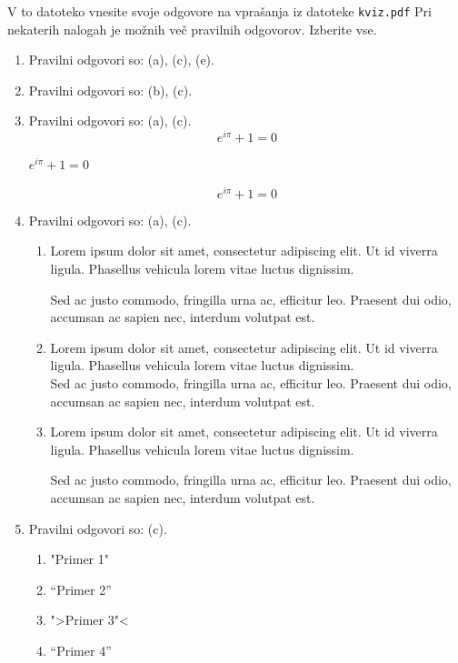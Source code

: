 \documentclass[11pt]{article}
\begin{document}
V to datoteko vnesite svoje odgovore na vprašanja iz datoteke \texttt{kviz.pdf}
Pri nekaterih nalogah je možnih več pravilnih odgovorov. Izberite vse.

\begin{enumerate}
    \item Pravilni odgovori so: (a), (c), (e).
    
    \item Pravilni odgovori so: (b), (c).
    
    \item Pravilni odgovori so: (a), (c).
      \[ e^{i \pi} + 1 = 0 \]
      \begin{center}
          \( e^{i \pi} + 1 = 0 \)
      \end{center}
      \begin{equation*}
          e^{i \pi} + 1 = 0
      \end{equation*}

    \item Pravilni odgovori so: (a), (c).
        \begin{enumerate}
            \item {
Lorem ipsum dolor sit amet, consectetur adipiscing 
elit. Ut id viverra ligula. Phasellus vehicula lorem 
vitae luctus dignissim. 
                
Sed ac justo commodo, fringilla urna ac, efficitur 
leo. Praesent dui odio, accumsan ac sapien nec, 
interdum volutpat est. 
            }
            \item {
Lorem ipsum dolor sit amet, consectetur adipiscing 
elit. Ut id viverra ligula. Phasellus vehicula lorem 
vitae luctus dignissim. \\
Sed ac justo commodo, fringilla urna ac, efficitur 
leo. Praesent dui odio, accumsan ac sapien nec, 
interdum volutpat est.             }
            \item {
Lorem ipsum dolor sit amet, consectetur adipiscing 
elit. Ut id viverra ligula. Phasellus vehicula lorem 
vitae luctus dignissim. \par
Sed ac justo commodo, fringilla urna ac, efficitur 
leo. Praesent dui odio, accumsan ac sapien nec, 
interdum volutpat est.             }
        \end{enumerate}
    
      \item Pravilni odgovori so: (c).
        \begin{enumerate}
          \item "Primer 1"
          \item ``Primer 2''
          \item ">Primer 3"<
          \item "`Primer 4"'
        \end{enumerate}


\end{enumerate}
\end{document}
